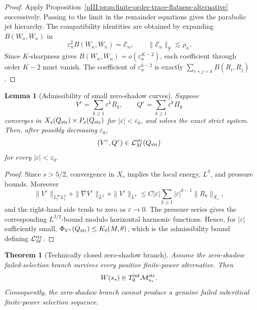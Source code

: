 \documentclass[11pt]{article}
\numberwithin{equation}{section}
\theoremstyle{plain}
\newtheorem{theorem}{Theorem}[section]
\newtheorem{lemma}{Lemma}[section]
\theoremstyle{definition}
\theoremstyle{remark}
\newcommand{\Mstr}{\mathcal M^{\rm str}}
\newcommand{\Lstr}{\mathcal L^{\rm str}}
\newcommand{\Tint}{T^{\rm int}}
\newcommand{\calE}{\mathcal E}
\newcommand{\calY}{\mathcal Y}
\begin{document}
\begin{proof}
Apply Proposition~\ref{pIII:prop:finite-order-trace-flatness-alternative} successively.  Passing to the
limit in the remainder equations gives the parabolic jet hierarchy.  The compatibility identities are
obtained by expanding \(B(W_n,W_n)\) in
\[
        \varepsilon_n^2B(W_n,W_n)=\calE_n,
        \qquad
        \|\calE_n\|_{\calY}\lesssim \rho_n.
\]
Since \(K\)-sharpness gives \(B(W_n,W_n)=o(\varepsilon_n^{K-2})\), each coefficient through order
\(K-2\) must vanish.  The coefficient of \(\varepsilon_n^{k-2}\) is exactly
\(\sum_{i+j=k}B(R_i,R_j)\).
\end{proof}

\begin{lemma}[Admissibility of small zero-shadow curves]
\label{pIII:lem:admissibility-zero-shadow-curve}
Suppose
\[
        V^\varepsilon=\sum_{k\ge1}\varepsilon^kR_k,
        \qquad
        Q^\varepsilon=\sum_{k\ge1}\varepsilon^k\Pi_k
\]
converges in \(X_s(Q_{\rm str})\times P_s(Q_{\rm str})\) for \(|\varepsilon|<\varepsilon_0\), and solves the exact strict system.  Then, after possibly decreasing \(\varepsilon_0\),
\[
        (V^\varepsilon,Q^\varepsilon)\in \Lstr_M(Q_{\rm str})
\]
for every \(|\varepsilon|<\varepsilon_0\).
\end{lemma}

\begin{proof}
Since \(s>5/2\), convergence in \(X_s\) implies the local energy, \(L^3\), and pressure bounds.
Moreover
\[
        \|V^\varepsilon\|_{L^\infty_tL^2_x}+\|\nabla V^\varepsilon\|_{L^2}+\|V^\varepsilon\|_{L^3}
        \le C|\varepsilon|\sum_{k\ge1}|\varepsilon|^{k-1}\|R_k\|_{X_s},
\]
and the right-hand side tends to zero as \(\varepsilon\to0\).  The pressure series gives the
corresponding \(L^{3/2}\)-bound modulo horizontal harmonic functions.  Hence, for \(|\varepsilon|\)
sufficiently small, \(\Phi_{V^\varepsilon}(Q_{\rm str})\le K_0(M,\theta)\), which is the admissibility
bound defining \(\Lstr_M\).
\end{proof}

\begin{theorem}[Technically closed zero-shadow branch]
\label{pIII:thm:technically-closed-zero-shadow-branch}
Assume the zero-shadow failed-selection branch survives every positive finite-power alternative.  Then
\[
        W(s_*)\in \Tint_0\Mstr_{s_*}.
\]
Consequently, the zero-shadow branch cannot produce a genuine failed subcritical finite-power
selection sequence.
\end{theorem}
\end{document}
